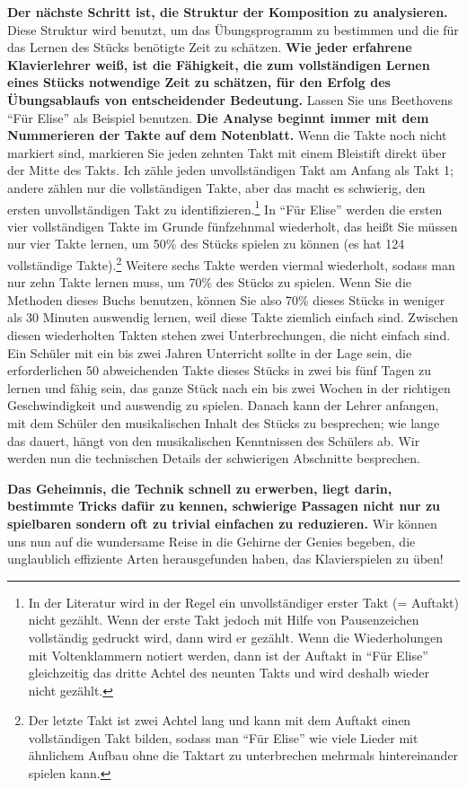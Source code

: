 \textbf{Der nächste Schritt ist, die Struktur der Komposition zu analysieren.}
Diese Struktur wird benutzt, um das Übungsprogramm zu bestimmen und die für das Lernen des Stücks benötigte Zeit zu schätzen.
\textbf{Wie jeder erfahrene Klavierlehrer weiß, ist die Fähigkeit, die zum vollständigen Lernen eines Stücks notwendige Zeit zu schätzen, für den Erfolg des Übungsablaufs von entscheidender Bedeutung.}
Lassen Sie uns Beethovens \enquote{Für Elise} als Beispiel benutzen.
\textbf{Die Analyse beginnt immer mit dem Nummerieren der Takte auf dem Notenblatt.}
Wenn die Takte noch nicht markiert sind, markieren Sie jeden zehnten Takt mit einem Bleistift direkt über der Mitte des Takts.
Ich zähle jeden unvollständigen Takt am Anfang als Takt 1; andere zählen nur die vollständigen Takte, aber das macht es schwierig, den ersten unvollständigen Takt zu identifizieren.\footnote{In der Literatur wird in der Regel ein  unvollständiger erster Takt (= Auftakt) nicht gezählt.
Wenn der erste Takt jedoch mit Hilfe von Pausenzeichen vollständig gedruckt wird, dann wird er gezählt.
Wenn die Wiederholungen mit Voltenklammern notiert werden, dann ist der Auftakt in \enquote{Für Elise} gleichzeitig das dritte Achtel des neunten Takts und wird deshalb wieder nicht gezählt.}
In \enquote{Für Elise} werden die ersten vier vollständigen Takte im Grunde fünfzehnmal wiederholt, das heißt Sie müssen nur vier Takte lernen, um 50\% des Stücks spielen zu können (es hat 124 vollständige Takte).\footnote{Der letzte Takt ist zwei Achtel lang und kann mit dem Auftakt einen vollständigen Takt bilden, sodass man \enquote{Für Elise} wie viele Lieder mit ähnlichem Aufbau ohne die Taktart zu unterbrechen mehrmals hintereinander spielen kann.}
Weitere sechs Takte werden viermal wiederholt, sodass man nur zehn Takte lernen muss, um 70\% des Stücks zu spielen.
Wenn Sie die Methoden dieses Buchs benutzen, können Sie also 70\% dieses Stücks in weniger als 30 Minuten auswendig lernen, weil diese Takte ziemlich einfach sind.
Zwischen diesen wiederholten Takten stehen zwei Unterbrechungen, die nicht einfach sind.
Ein Schüler mit ein bis zwei Jahren Unterricht sollte in der Lage sein, die erforderlichen 50 abweichenden Takte dieses Stücks in zwei bis fünf Tagen zu lernen und fähig sein, das ganze Stück nach ein bis zwei Wochen in der richtigen Geschwindigkeit und auswendig zu spielen.
Danach kann der Lehrer anfangen, mit dem Schüler den musikalischen Inhalt des Stücks zu besprechen; wie lange das dauert, hängt von den musikalischen Kenntnissen des Schülers ab.
Wir werden nun die technischen Details der schwierigen Abschnitte besprechen.

\textbf{Das Geheimnis, die Technik schnell zu erwerben, liegt darin, bestimmte Tricks dafür zu kennen, schwierige Passagen nicht nur zu spielbaren sondern oft zu trivial einfachen zu reduzieren.}
Wir können uns nun auf die wundersame Reise in die Gehirne der Genies begeben, die unglaublich effiziente Arten herausgefunden haben, das Klavierspielen zu üben!



